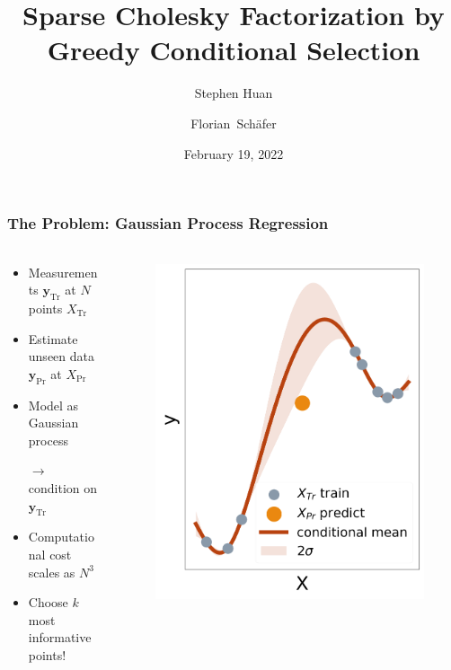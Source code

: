 \documentclass{beamer}                             %
\title[]{Sparse Cholesky Factorization by \\ Greedy Conditional Selection}
\subtitle{}
\author[Huan, Sch{\"a}fer]
{Stephen Huan \and Florian\ Sch{\"a}fer}
\institute[Georgia Institute of Technology]
{
  Georgia Institute of Technology
}
\date[]{February 19, 2022}
\renewcommand{\vec}[1]{\bm{#1}}
\begin{document}
\frame{\titlepage}

\begin{frame}
\frametitle{The Problem: Gaussian Process Regression}
\framesubtitle{}
  \begin{columns}
    \begin{column}{0.6\textwidth}
      \begin{itemize}
        \item<+-> Measurements \( \vec{y}_\text{Tr} \) at
          \( N \) points \( X_\text{Tr} \)

        \item<+-> Estimate unseen data \(
          \vec{y}_\text{Pr} \) at \( X_\text{Pr} \)

        \item<+-> Model as Gaussian process

          \( \rightarrow \) condition on \( \vec{y}_\text{Tr} \)

        \item<+-> Computational cost scales as \( N^3 \)

        \item<+-> Choose \( k \) most informative points!
      \end{itemize}
    \end{column}
    \begin{column}{0.4\textwidth}
      \begin{figure}
        \centering
        \includegraphics[width=\textwidth]{graphs/predict_all}
      \end{figure}
    \end{column}
  \end{columns}
\end{frame}
\end{document}
